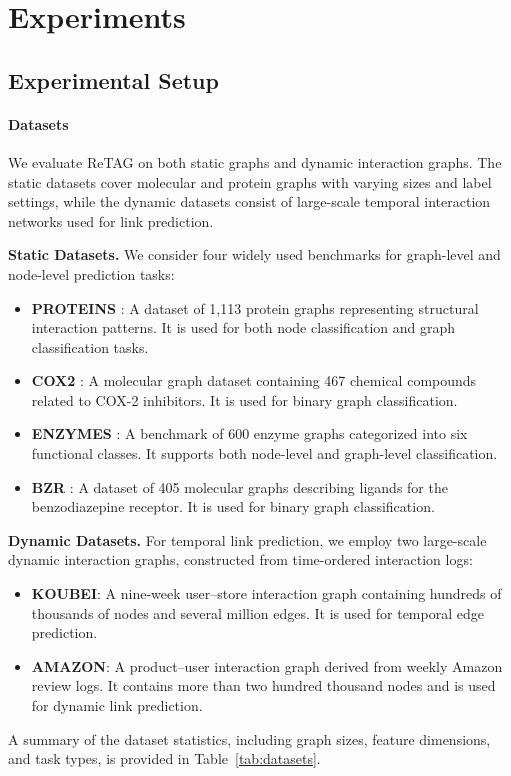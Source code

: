 \section{Experiments}
\subsection{Experimental Setup}
\paragraph{Datasets}  
We evaluate ReTAG on both static graphs and dynamic interaction graphs. 
The static datasets cover molecular and protein graphs with varying sizes and label settings, 
while the dynamic datasets consist of large-scale temporal interaction networks used for link prediction.

\textbf{Static Datasets.}
We consider four widely used benchmarks for graph-level and node-level prediction tasks:

\begin{itemize}
    \item \textbf{PROTEINS} \cite{protein_reference}: 
    A dataset of 1,113 protein graphs representing structural interaction patterns. 
    It is used for both node classification and graph classification tasks.

    \item \textbf{COX2} \cite{rossi2015networkrepository}: 
    A molecular graph dataset containing 467 chemical compounds related to COX-2 inhibitors. 
    It is used for binary graph classification.

    \item \textbf{ENZYMES} \cite{enzymes_reference}: 
    A benchmark of 600 enzyme graphs categorized into six functional classes. 
    It supports both node-level and graph-level classification.

    \item \textbf{BZR} \cite{rossi2015networkrepository}: 
    A dataset of 405 molecular graphs describing ligands for the benzodiazepine receptor. 
    It is used for binary graph classification.
\end{itemize}

\textbf{Dynamic Datasets.}
For temporal link prediction, we employ two large-scale dynamic interaction graphs, 
constructed from time-ordered interaction logs:
\begin{itemize}
    \item \textbf{KOUBEI}: 
    A nine-week user–store interaction graph containing hundreds of thousands of nodes and several million edges. 
    It is used for temporal edge prediction.

    \item \textbf{AMAZON}: 
    A product–user interaction graph derived from weekly Amazon review logs. 
    It contains more than two hundred thousand nodes and is used for dynamic link prediction.
\end{itemize}
A summary of the dataset statistics, including graph sizes, feature dimensions, and task types, is provided in Table~\ref{tab:datasets}.

